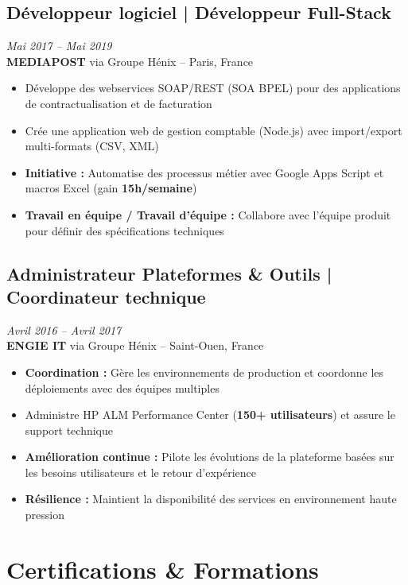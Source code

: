\documentclass[11pt,a4paper]{article}
\newcommand{\highlight}[1]{\textcolor{primaryblue}{\textbf{#1}}}
\newcommand{\keypoint}[1]{\textbf{#1}}
\begin{document}
\subsection*{Développeur logiciel | Développeur Full-Stack} \hfill \textit{\color{mediumgray}Mai 2017 -- Mai 2019}\\
\textcolor{primaryblue}{\textbf{MEDIAPOST}} via Groupe Hénix -- Paris, France
\begin{itemize}[leftmargin=22pt]
    \item Développe des webservices SOAP/REST (SOA BPEL) pour des applications de contractualisation et de facturation
    \item Crée une application web de gestion comptable (Node.js) avec import/export multi-formats (CSV, XML)
    \item \highlight{Initiative :} Automatise des processus métier avec Google Apps Script et macros Excel (gain \keypoint{15h/semaine})
    \item \highlight{Travail en équipe / Travail d'équipe :} Collabore avec l'équipe produit pour définir des spécifications techniques
\end{itemize}

\subsection*{Administrateur Plateformes \& Outils | Coordinateur technique} \hfill \textit{\color{mediumgray}Avril 2016 -- Avril 2017}\\
\textcolor{primaryblue}{\textbf{ENGIE IT}} via Groupe Hénix -- Saint-Ouen, France
\begin{itemize}[leftmargin=22pt]
    \item \highlight{Coordination :} Gère les environnements de production et coordonne les déploiements avec des équipes multiples
    \item Administre HP ALM Performance Center (\keypoint{150+ utilisateurs}) et assure le support technique
    \item \highlight{Amélioration continue :} Pilote les évolutions de la plateforme basées sur les besoins utilisateurs et le retour d'expérience
    \item \highlight{Résilience :} Maintient la disponibilité des services en environnement haute pression
\end{itemize}

\vspace{6pt}

\section*{Certifications \& Formations}
\end{document}
